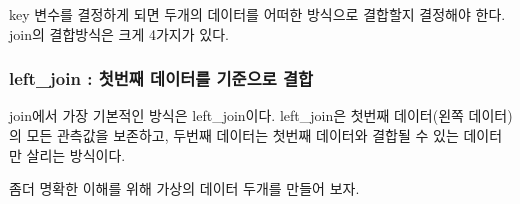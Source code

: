 \documentclass[
]{book}
\theoremstyle{definition}
\theoremstyle{definition}
\theoremstyle{definition}
\theoremstyle{definition}
\theoremstyle{remark}
\begin{document}
key 변수를 결정하게 되면 두개의 데이터를 어떠한 방식으로 결합할지 결정해야 한다. join의 결합방식은 크게 4가지가 있다.

\hypertarget{left_join-uxccabuxbc88uxc9f8-uxb370uxc774uxd130uxb97c-uxae30uxc900uxc73cuxb85c-uxacb0uxd569}{%
\subsubsection{left\_join : 첫번째 데이터를 기준으로 결합}\label{left_join-uxccabuxbc88uxc9f8-uxb370uxc774uxd130uxb97c-uxae30uxc900uxc73cuxb85c-uxacb0uxd569}}

join에서 가장 기본적인 방식은 left\_join이다. left\_join은 첫번째 데이터(왼쪽 데이터)의 모든 관측값을 보존하고, 두번째 데이터는 첫번째 데이터와 결합될 수 있는 데이터만 살리는 방식이다.

좀더 명확한 이해를 위해 가상의 데이터 두개를 만들어 보자.
\end{document}
